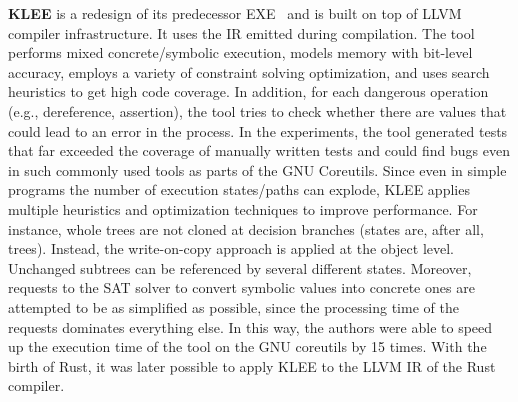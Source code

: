\documentclass{article}
\begin{document}

\textbf{KLEE} is a redesign of its predecessor EXE~\cite{Cadar2008} and is built on top of LLVM compiler infrastructure. It uses the \ac{IR} emitted during compilation. The tool performs mixed concrete/symbolic execution, models memory with bit-level accuracy, employs a variety of constraint solving optimization, and uses search heuristics to get high code coverage. In addition, for each dangerous operation (e.g., dereference, assertion), the tool tries to check whether there are values that could lead to an error in the process. In the experiments, the tool generated tests that far exceeded the coverage of manually written tests and could find bugs even in such commonly used tools as parts of the GNU Coreutils. Since even in simple programs the number of execution states/paths can explode, KLEE applies multiple heuristics and optimization techniques to improve performance. For instance, whole trees are not cloned at decision branches (states are, after all, trees). Instead, the write-on-copy approach is applied at the object level. Unchanged subtrees can be referenced by several different states. Moreover, requests to the SAT solver to convert symbolic values into concrete ones are attempted to be as simplified as possible, since the processing time of the requests dominates everything else. In this way, the authors were able to speed up the execution time of the tool on the GNU coreutils by 15 times. With the birth of Rust, it was later possible to apply KLEE to the LLVM IR of the Rust compiler. 
\end{document}
